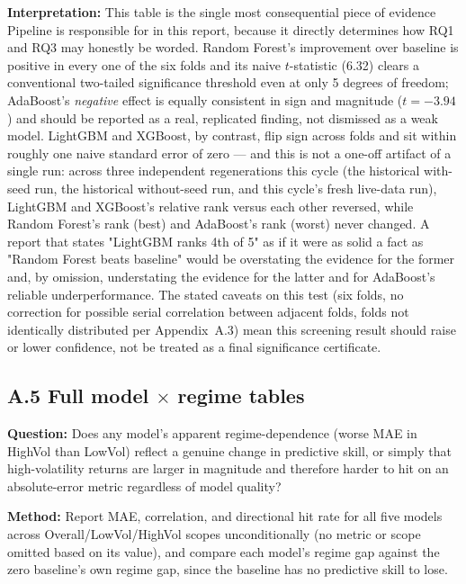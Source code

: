 \documentclass[11pt]{article}
\newcommand{\qbox}[1]{\par\noindent\textbf{Question:} #1\par}
\newcommand{\methodbox}[1]{\par\noindent\textbf{Method:} #1\par}
\newcommand{\ibox}[1]{\par\noindent\textbf{Interpretation:} #1\par}
\begin{document}
\ibox{This table is the single most consequential piece of evidence Pipeline is responsible for in this report, because it directly determines how RQ1 and RQ3 may honestly be worded. Random Forest's improvement over baseline is positive in every one of the six folds and its naive $t$-statistic (6.32) clears a conventional two-tailed significance threshold even at only 5 degrees of freedom; AdaBoost's \emph{negative} effect is equally consistent in sign and magnitude ($t=-3.94$) and should be reported as a real, replicated finding, not dismissed as a weak model. LightGBM and XGBoost, by contrast, flip sign across folds and sit within roughly one naive standard error of zero --- and this is not a one-off artifact of a single run: across three independent regenerations this cycle (the historical with-seed run, the historical without-seed run, and this cycle's fresh live-data run), LightGBM and XGBoost's relative rank versus each other reversed, while Random Forest's rank (best) and AdaBoost's rank (worst) never changed. A report that states "LightGBM ranks 4th of 5" as if it were as solid a fact as "Random Forest beats baseline" would be overstating the evidence for the former and, by omission, understating the evidence for the latter and for AdaBoost's reliable underperformance. The stated caveats on this test (six folds, no correction for possible serial correlation between adjacent folds, folds not identically distributed per Appendix~A.3) mean this screening result should raise or lower confidence, not be treated as a final significance certificate.}

\subsection*{A.5 Full model $\times$ regime tables}

\qbox{Does any model's apparent regime-dependence (worse MAE in HighVol than LowVol) reflect a genuine change in predictive skill, or simply that high-volatility returns are larger in magnitude and therefore harder to hit on an absolute-error metric regardless of model quality?}

\methodbox{Report MAE, correlation, and directional hit rate for all five models across Overall/LowVol/HighVol scopes unconditionally (no metric or scope omitted based on its value), and compare each model's regime gap against the zero baseline's own regime gap, since the baseline has no predictive skill to lose.}
\end{document}
